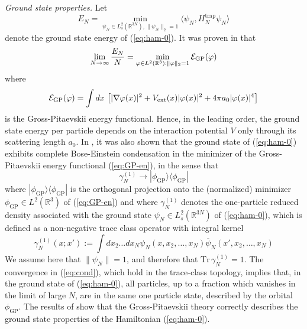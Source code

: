 \documentclass[11pt,a4paper]{article}
\newcommand{\bR}{{\mathbb R}}
\newcommand{\tr}{\mbox{Tr}}
\newcommand{\cE}{{\cal E}}
\begin{document}
{\it Ground state properties.} Let \[ E_N = \min_{\psi_N \in L^2_s (\bR^{3N}), \| \psi_N \|_2 = 1} \langle \psi_N , H^{\text{trap}}_N \psi_N \rangle \]
denote the ground state energy of (\ref{eq:ham-0}). It was proven in \cite{LSY} that
\[ \lim_{N \to \infty} \frac{E_N}{N} = \min_{\varphi \in L^2 (\bR^3) : \| \varphi \|_2 = 1} \cE_{\text{GP}} (\varphi) \]
where 
\begin{equation}\label{eq:GP-en} \cE_{\text{GP}} (\varphi) = \int dx \, \left[ |\nabla \varphi (x)|^2 + V_{\text{ext}} (x) |\varphi (x)|^2 + 4 \pi a_0 |\varphi (x)|^4 \right] \end{equation}
is the Gross-Pitaevskii energy functional. Hence, in the leading order, the ground state energy per particle depends on the interaction potential $V$ only through its scattering length $a_0$. In \cite{LS}, it was also shown that the ground state of (\ref{eq:ham-0}) exhibits complete Bose-Einstein condensation in the minimizer of the Gross-Pitaevskii energy functional (\ref{eq:GP-en}),
in the sense that 
\begin{equation}\label{eq:cond} \gamma_N^{(1)} \to | \phi_{\text{GP}} \rangle \langle \phi_{\text{GP}}| \end{equation}
where $|\phi_{\text{GP}} \rangle \langle \phi_{\text{GP}} |$ is the orthogonal projection onto the (normalized) 
minimizer $\phi_{\text{GP}} \in L^2 (\bR^3)$ of (\ref{eq:GP-en}) and where $\gamma^{(1)}_N$ denotes the one-particle reduced density associated with the ground state $\psi_N \in L^2_s (\bR^{3N})$ of (\ref{eq:ham-0}), which is defined as a non-negative trace class operator with integral kernel
\begin{equation}\label{eq:one-red} \gamma^{(1)}_N (x;x') := \int dx_2 \dots dx_N \psi_N (x , x_2, \dots  ,x_N) \overline{\psi}_N (x' , x_2 , \dots , x_N) \end{equation}
We assume here that $\| \psi_N \|  =1$, and therefore that $\tr \, \gamma^{(1)}_N = 1$. The convergence in (\ref{eq:cond}), which hold in the trace-class topology, implies that, in the ground state of (\ref{eq:ham-0}), all particles, up to a fraction which vanishes in the limit of large $N$, are in the same one particle state, described by the orbital $\phi_{\text{GP}}$. The results of \cite{LSY,LS} show that the Gross-Pitaevskii theory correctly describes the ground state properties of the Hamiltonian (\ref{eq:ham-0}). 

\bigskip
\end{document}
